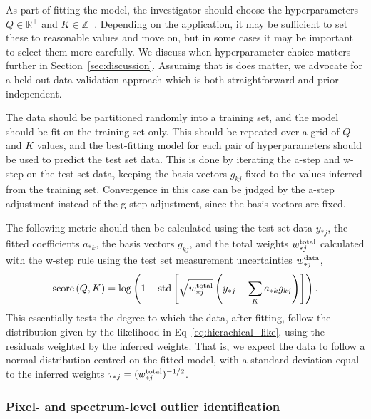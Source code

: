 \documentclass[onecolumn,floatfix]{aastex631}
\begin{document}
As part of fitting the model, the investigator should choose the hyperparameters $Q\in \mathbb{R}^+$ and $K\in \mathbb{Z}^+$.
Depending on the application, it may be sufficient to set these to reasonable values and move on, but in some cases it may be important to select them more carefully.
We discuss when hyperparameter choice matters further in Section~\ref{sec:discussion}.
Assuming that is does matter, we advocate for a held-out data validation approach which is both straightforward and prior-independent.

The data should be partitioned randomly into a training set, and the model should be fit on the training set only.
This should be repeated over a grid of $Q$ and $K$ values, and the best-fitting model for each pair of hyperparameters should be used to predict the test set data.
This is done by iterating the a-step and w-step on the test set data, keeping the basis vectors $g_{kj}$ fixed to the values inferred from the training set.
Convergence in this case can be judged by the a-step adjustment instead of the g-step adjustment, since the basis vectors are fixed.

The following metric should then be calculated using the test set data $y_{*j}$, the fitted coefficients $a_{*k}$, the basis vectors $g_{kj}$, and the total weights $w^{\rm total}_{*j}$ calculated with the w-step rule using the test set measurement uncertainties $w^{\rm data}_{*j}$,
\begin{align}
    {\rm score} \, (Q, K) = {\rm log} \left( 1 - {\rm std} \left[ \sqrt{w^{\rm total}_{*j}}\left(y_{*j} - \sum_K a_{*k} g_{kj}\right) \right] \right). \label{eq:score}
\end{align}
This essentially tests the degree to which the data, after fitting, follow the distribution given by the likelihood in Eq~\eqref{eq:hierachical_like}, using the residuals weighted by the inferred weights.
That is, we expect the data to follow a normal distribution centred on the fitted model, with a standard deviation equal to the inferred weights $\tau_{*j}=(w_{*j}^{\rm total})^{-1/2}$.

\subsubsection{Pixel- and spectrum-level outlier identification} \label{sec:outlier_id}
\end{document}

